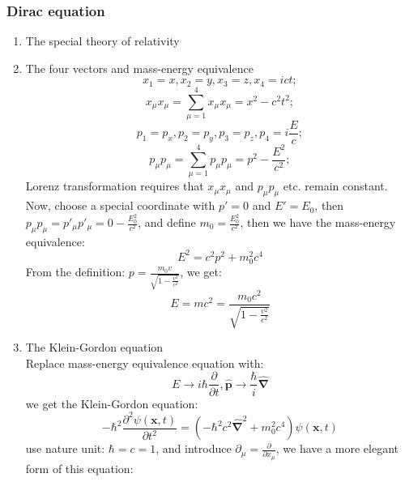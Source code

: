 \documentclass[12pt]{article}
\numberwithin{equation}{section}
\begin{document}
\subsubsection{Dirac equation}
\begin{enumerate}
\item The special theory of relativity
\item The four vectors and mass-energy equivalence \\
	\begin{equation}x_1=x, x_2=y, x_3=z, x_4=ict;\end{equation}
	\begin{equation}x_\mu x_\mu = \sum_{\mu=1}^{4} x_\mu x_\mu = x^2-c^2 t^2; \end{equation}
	\begin{equation}p_1=p_x, p_2=p_y, p_3=p_z, p_4=i\frac{E}{c};\end{equation}
	\begin{equation}p_\mu p_\mu = \sum_{\mu=1}^{4} p_\mu p_\mu = p^2-\frac{E^2}{c^2};\end{equation}
	Lorenz transformation requires that $x_\mu x_\mu$ and $p_\mu p_\mu$ etc. remain constant.\\
	Now, choose a special coordinate with $p'=0$ and $E'=E_0$, then 
	$p_\mu p_\mu=p'_\mu p'_\mu=0-\frac{E_0^2}{c^2}$, and define $m_0=\frac{E_0^2}{c^2}$, 
	then we have the mass-energy equivalence:
	\begin{equation}E^2=c^2p^2+m_0^2c^4\end{equation}
	From the definition: $p=\frac{m_0v}{\sqrt{1-\frac{v^2}{c^2}}}$, we get:
	\begin{equation}E=mc^2=\frac{m_0c^2}{\sqrt{1-\frac{v^2}{c^2}}}\end{equation}
\item The Klein-Gordon equation \\
	Replace mass-energy equivalence equation with:
	\begin{equation}E \rightarrow i\hbar \frac{\partial}{\partial{t}}, 
	\hat{\mathbf{p}} \rightarrow \frac{\hbar}{i} \hat{\mathbf{\nabla}}\end{equation}
	we get the Klein-Gordon equation:
	\begin{equation}-\hbar^2\frac{\partial^2{\psi(\mathbf{x},t)}}{\partial{t}^2}=
	(-\hbar^2 c^2\hat{\mathbf{\nabla}}^2+m^2_{0}c^4)\psi(\mathbf{x},t)\end{equation}
	use nature unit: $\hbar=c=1$, and introduce $\partial_{\mu}=\frac{\partial}{\partial{x}_{\mu}}$, 
	we have a more elegant form of this equation:

\end{enumerate}
\end{document}
